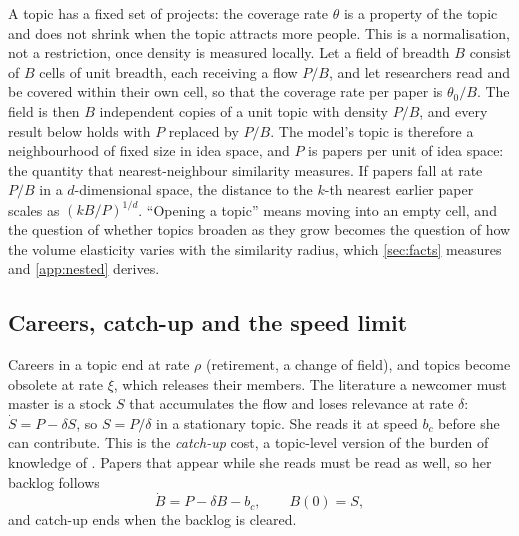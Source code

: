 \begin{remark}\label{rem:breadth}
A topic has a fixed set of projects: the coverage rate $\theta$ is a property
of the topic and does not shrink when the topic attracts more people. This is
a normalisation, not a restriction, once density is measured locally. Let a
field of breadth $B$ consist of $B$ cells of unit breadth, each receiving a
flow $P/B$, and let researchers read and be covered within their own cell, so
that the coverage rate per paper is $\theta_0/B$. The field is then $B$
independent copies of a unit topic with density $P/B$, and every result below
holds with $P$ replaced by $P/B$. The model's topic is therefore a
neighbourhood of fixed size in idea space, and $P$ is papers per unit of idea
space: the quantity that nearest-neighbour similarity measures. If papers fall
at rate $P/B$ in a $d$-dimensional space, the distance to the $k$-th nearest
earlier paper scales as $(kB/P)^{1/d}$. ``Opening a topic'' means moving into
an empty cell, and the question of whether topics broaden as they grow becomes
the question of how the volume elasticity varies with the similarity radius,
which \cref{sec:facts} measures and \cref{app:nested} derives.
\end{remark}

\subsection{Careers, catch-up and the speed limit}\label{sec:careers}

Careers in a topic end at rate $\rho$ (retirement, a change of field), and
topics become obsolete at rate $\xi$, which releases their members. The
literature a newcomer must master is a stock $S$ that accumulates the flow and
loses relevance at rate $\delta$: $\dot S=P-\delta S$, so $S=P/\delta$ in a
stationary topic. She reads it at speed $b_c$ before she can contribute. This
is the \emph{catch-up} cost, a topic-level version of the burden of knowledge
of \citet{jones2009}. Papers that appear while she reads must be read as well,
so her backlog follows
\begin{equation}\label{eq:backlog}
\dot B=P-\delta B-b_c,\qquad B(0)=S,
\end{equation}
and catch-up ends when the backlog is cleared.

